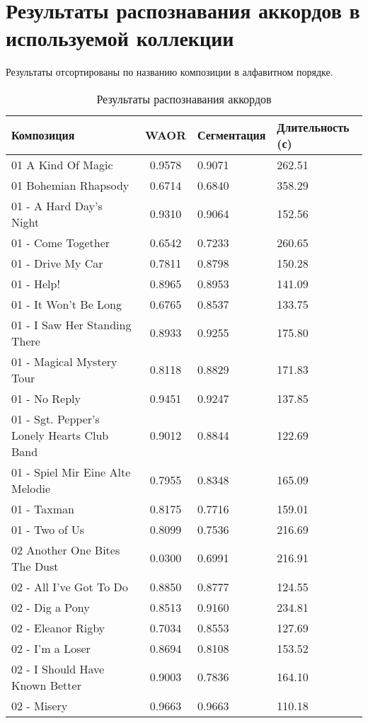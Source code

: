 \appendix
\chapter{Результаты распознавания аккордов в используемой коллекции}
\label{AppendixA}

Результаты отсортированы по названию композиции в алфавитном порядке.

\fontsize{9pt}{9pt}\selectfont
\begin{longtable}[c]{|l|c|l|l|}
\caption{Результаты распознавания аккордов}\label{Namelists}
\\
\hline
Композиция & WAOR & Сегментация & Длительность (с) \\
\hline
01 A Kind Of Magic & 0.9578 & 0.9071 & 262.51 \\
01 Bohemian Rhapsody & 0.6714 & 0.6840 & 358.29 \\
01 - A Hard Day's Night & 0.9310 & 0.9064 & 152.56 \\
01 - Come Together & 0.6542 & 0.7233 & 260.65 \\
01 - Drive My Car & 0.7811 & 0.8798 & 150.28 \\
01 - Help! & 0.8965 & 0.8953 & 141.09 \\
01 - It Won't Be Long & 0.6765 & 0.8537 & 133.75 \\
01 - I Saw Her Standing There & 0.8933 & 0.9255 & 175.80 \\
01 - Magical Mystery Tour & 0.8118 & 0.8829 & 171.83 \\
01 - No Reply & 0.9451 & 0.9247 & 137.85 \\
01 - Sgt. Pepper's Lonely Hearts Club Band & 0.9012 & 0.8844 & 122.69 \\
01 - Spiel Mir Eine Alte Melodie & 0.7955 & 0.8348 & 165.09 \\
01 - Taxman & 0.8175 & 0.7716 & 159.01 \\
01 - Two of Us & 0.8099 & 0.7536 & 216.69 \\
02 Another One Bites The Dust & 0.0300 & 0.6991 & 216.91 \\
02 - All I've Got To Do & 0.8850 & 0.8777 & 124.55 \\
02 - Dig a Pony & 0.8513 & 0.9160 & 234.81 \\
02 - Eleanor Rigby & 0.7034 & 0.8553 & 127.69 \\
02 - I'm a Loser & 0.8694 & 0.8108 & 153.52 \\
02 - I Should Have Known Better & 0.9003 & 0.7836 & 164.10 \\
02 - Misery & 0.9663 & 0.9663 & 110.18 \\

\end{longtable}
